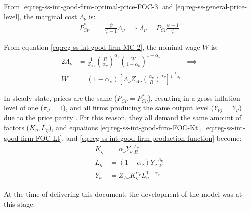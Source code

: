\documentclass[
	thesis.tex
	]{subfiles}
\begin{document}
From \ref{eq:reg-ss-int-good-firm-optimal-price-FOC-3} and \ref{eq:reg-ss-general-price-level}, the marginal cost $\Lambda_{\nu}$ is:
\begin{align}
	P_{C\nu}^\ast &= \frac{\psi}{\psi-1} \Lambda_{\nu} \implies \Lambda_{\nu} = P_{C\nu} \frac{\psi-1}{\psi} \label{eq:reg-ss-marginal-cost}
\end{align}

From equation \ref{eq:reg-ss-int-good-firm-MC-2}, the nominal wage $W$ is:
\begin{alignat}{2}
	\Lambda_{\nu} &= \frac{1}{Z_{A\nu}} \left( \frac{R}{{\alpha_\nu}} \right)^{{\alpha_\nu}} \left( \frac{W}{1-{\alpha_\nu}} \right)^{1-{\alpha_\nu}} &\implies \nonumber \\ 
	W &= (1-{\alpha_\nu}) \left[ \Lambda_{\nu} Z_{A\nu} \left( \frac{{\alpha_\nu}}{R} \right)^{{\alpha_\nu}} \right]^\frac{1}{1-{\alpha_\nu}} &\, \label{eq:reg-ss-nominal-wage}
\end{alignat}

In steady state, prices are the same ($P_{C\nu} = P_{C\nu}^\ast$), resulting in a gross inflation level of one ($\pi_{\nu} = 1$), and all firms producing the same output level ($Y_{\nu j} = Y_{\nu}$) due to the price parity \cite[Lecture 13, p.12]{solis-garcia_ucb_2022}. For this reason, they all demand the same amount of factors ($K_{\eta}, L_{\eta}$), and equations \ref{eq:reg-ss-int-good-firm-FOC-Kt}, \ref{eq:reg-ss-int-good-firm-FOC-Lt}, and \ref{eq:reg-ss-int-good-firm-production-function} become:
\begin{align}
	K_{\eta} &= {\alpha_\nu} Y_{\nu} \frac{\Lambda_{\nu}}{R} \label{eq:reg-ss-int-good-firm-FOC-Kt-2} \\
	L_{\eta} &= (1-{\alpha_\nu}) Y_{\nu} \frac{\Lambda_{\nu}}{W} \label{eq:reg-ss-int-good-firm-FOC-Lt-2} \\
	Y_{\nu} &= Z_{A\nu} K_{\eta}^{\alpha_\nu} L_{\eta}^{1 -{\alpha_\nu}} \label{eq:reg-ss-int-good-firm-production-function-2}
\end{align}

At the time of delivering this document, the development of the model was at this stage.
\end{document}
